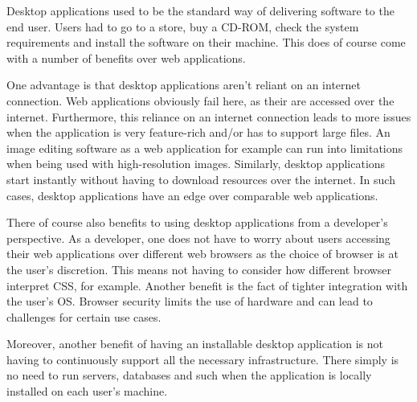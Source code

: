 Desktop applications used to be the standard way of delivering software to the end user.
Users had to go to a store, buy a CD-ROM, check the system requirements and install the software 
on their machine.
This does of course come with a number of benefits over web applications.\par
One advantage is that desktop applications aren't reliant on an internet connection.
Web applications obviously fail here, as their are accessed over the internet.
Furthermore, this reliance on an internet connection leads to more issues when the application
is very feature-rich and/or has to support large files. 
An image editing software as a web application for example can run into limitations when being
used with high-resolution images. 
Similarly, desktop applications start instantly without having to download resources over the 
internet. 
In such cases, desktop applications have an edge over comparable web applications.\cite{jensen2017}\par
There of course also benefits to using desktop applications from a developer's perspective.
As a developer, one does not have to worry about users accessing their web applications over different web browsers 
as the choice of browser is at the user's discretion. 
This means not having to consider how different browser interpret CSS, for example. 
Another benefit is the fact of tighter integration with the user's OS.
Browser security limits the use of hardware and can lead to challenges for certain use cases.\cite{jensen2017}\par
Moreover, another benefit of having an installable desktop application is not having to continuously support all the necessary infrastructure.
There simply is no need to run servers, databases and such when the application is locally installed on each user's machine.\cite{jensen2017}
